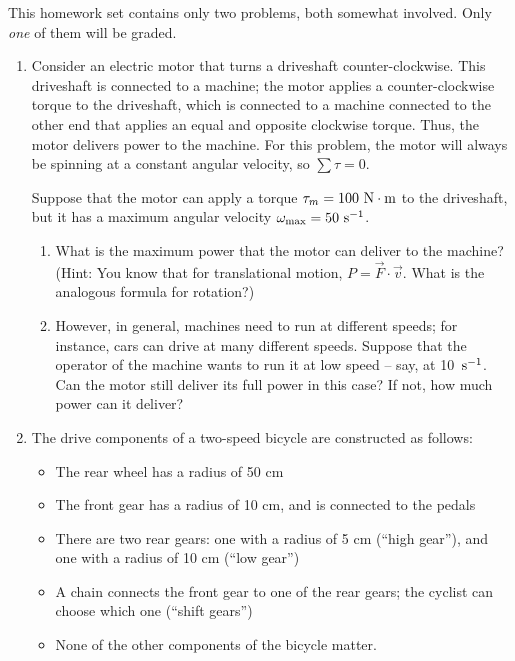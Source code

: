 \documentclass[12pt]{article}
\begin{document}
\Large
\centerline{}
\normalsize
\centerline{}

This homework set contains only two problems, both somewhat involved. Only {\it one} of them will be graded.

\begin{enumerate}

\item Consider an electric motor that turns a driveshaft counter-clockwise. This driveshaft is connected to a machine; the motor applies a counter-clockwise torque to the driveshaft, which is connected to a machine connected to the other end that applies an equal and opposite clockwise torque. Thus, the motor delivers power to the machine. For this problem, the motor will always be spinning at a constant angular velocity, so $\sum \tau = 0$.

Suppose that the motor can apply a torque $\tau_m=100~\rm N \cdot \rm m$ to the driveshaft, but it has a maximum angular velocity $\omega_{\rm max} = 50~\rm s^{-1}$.

\begin{enumerate}
	\item What is the maximum power that the motor can deliver to the machine? (Hint: You know that for translational motion, $P = \vec F \cdot \vec v$. What is the analogous formula for rotation?)
	\item However, in general, machines need to run at different speeds; for instance, cars can drive at many different speeds. Suppose that the operator of the machine wants to run it at low speed -- say, at 10~$\rm s^{-1}$. Can the motor still deliver its full power in this case? If not, how much power can it deliver?

\end{enumerate}




\item The drive components of a two-speed bicycle are constructed as follows:
\begin{itemize}
\item The rear wheel has a radius of 50 cm
\item The front gear has a radius of 10 cm, and is connected to the pedals
\item There are two rear gears: one with a radius of 5 cm (``high gear''), and one with a radius of 10 cm (``low gear'')
\item A chain connects the front gear to one of the rear gears; the cyclist can choose which one (``shift gears'')
\item None of the other components of the bicycle matter.
\end{itemize}



\end{enumerate}
\end{document}
